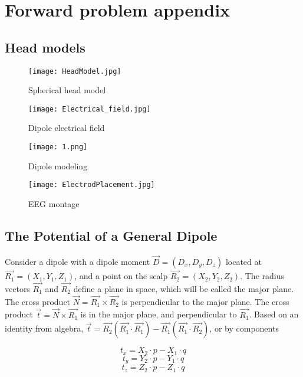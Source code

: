 \section{Forward problem appendix}
\subsection{Head models}

\begin{figure}[!htbp]
    \centering
    \texttt{[image: HeadModel.jpg]}
    \caption{Spherical head model}\label{Fig4}
\end{figure}

\begin{figure}[!htbp]
    \centering
    \texttt{[image: Electrical\_field.jpg]}
    \caption{Dipole electrical field}\label{Fig7}
\end{figure}




\begin{figure}[!htbp]
    \centering
    \texttt{[image: 1.png]}
    \caption{Dipole modeling}
\end{figure}

\begin{figure}[!htbp]
    \centering
    \texttt{[image: ElectrodPlacement.jpg]}
    \caption{EEG montage}
    \label{Fig1}
\end{figure}

\newpage
\subsection{The Potential of a General Dipole}\label{Ap1}



Consider a dipole with a dipole moment ${\vec{D}}=(D_x,D_y,D_z)$ located at ${\vec{R_1}}=(X_1,Y_1,Z_1)$, and a point on the scalp ${\vec{R_2}}=(X_2,Y_2,Z_2)$. The radius vectors $\vec{R_1}$ and $\vec{R_2}$ define a plane in space, which will be called the major plane. The cross product ${\vec{N}=\vec{R_1} \times \vec{R_2}}$ is perpendicular to the major plane. The cross product ${\vec{t}=\vec{N} \times \vec{R_1}}$ is in the major plane, and perpendicular to ${\vec{R_1}}$. Based on an identity from algebra, ${\vec{t}=\vec{R_2}(\vec{R_1} \cdot \vec{R_1})-\vec{R_1}(\vec{R_1} \cdot \vec{R_2})}$, or by components



\begin{figure}[!htbp]
%
\centering
\begin{equation}
t_x=X_2 \cdot p-X_1 \cdot q
\end{equation}
\endminipage\hfill
{}%
\centering
\begin{equation}
t_y=Y_2 \cdot p-Y_1 \cdot q
\end{equation}
\endminipage\hfill
{}%
\centering
\begin{equation}
 t_z=Z_2 \cdot p-Z_1 \cdot q
\end{equation}
\endminipage\hfill
\end{figure}






